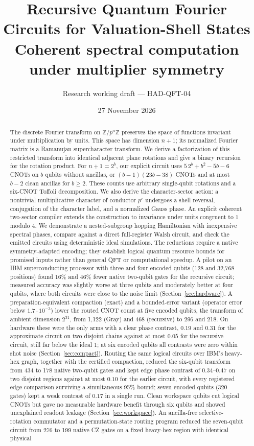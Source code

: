 \documentclass[11pt]{article}
\title{Recursive Quantum Fourier Circuits for Valuation-Shell States\\[3pt]\large Coherent spectral computation under multiplier symmetry}
\author{Research working draft --- HAD-QFT-04}
\date{27 November 2026}
\newcommand{\Z}{\mathbb Z}
\begin{document}
\maketitle
\begin{abstract}
The discrete Fourier transform on $\Z/p^n\Z$ preserves the space of functions invariant under multiplication by units. This space has dimension $n+1$; its normalized Fourier matrix is a Ramanujan supercharacter transform. We derive a factorization of this restricted transform into identical adjacent plane rotations and give a binary recursion for the rotation product. For $n+1=2^b$, our explicit circuit uses $5\,2^b+b^2-5b-6$ CNOTs on $b$ qubits without ancillas, or $(b-1)(23b-38)$ CNOTs and at most $b-2$ clean ancillas for $b\ge2$. These counts use arbitrary single-qubit rotations and a six-CNOT Toffoli decomposition. We also derive the character-sector action: a nontrivial multiplicative character of conductor $p^c$ undergoes a shell reversal, conjugation of the character label, and a normalized Gauss phase. An explicit coherent two-sector compiler extends the construction to invariance under units congruent to $1$ modulo $4$. We demonstrate a nested-subgroup hopping Hamiltonian with inexpensive spectral phases, compare against a direct full-register Walsh circuit, and check the emitted circuits using deterministic ideal simulations. The reductions require a native symmetry-adapted encoding; they establish logical quantum resource bounds for promised inputs rather than general QFT or computational speedup. A pilot on an IBM superconducting processor with three and four encoded qubits (128 and 32,768 positions) found $16\%$ and $46\%$ fewer native two-qubit gates for the recursive circuit; measured accuracy was slightly worse at three qubits and moderately better at four qubits, where both circuits were close to the noise limit (Section~\ref{sec:hardware}). A preparation-equivalent compaction (exact) and a bounded-error variant (operator error below $1.7\cdot10^{-3}$) lower the routed CNOT count at five encoded qubits, the transform of ambient dimension $2^{31}$, from 1,122 (Gray) and 468 (recursive) to 296 and 218. On hardware these were the only arms with a clear phase contrast, $0.19$ and $0.31$ for the approximate circuit on two disjoint chains against at most $0.05$ for the recursive circuit, still far below the ideal $1$; at six encoded qubits all contrasts were zero within shot noise (Section~\ref{sec:compact}). Routing the same logical circuits over IBM's heavy-hex graph, together with the certified compaction, reduced the six-qubit transform from 434 to 178 native two-qubit gates and kept edge phase contrast of $0.34$--$0.47$ on two disjoint regions against at most $0.10$ for the earlier circuit, with every registered edge comparison surviving a simultaneous 95\% bound; seven encoded qubits (320 gates) kept a weak contrast of $0.17$ in a single run. Clean workspace qubits cut logical CNOTs but gave no measurable hardware benefit through six qubits and showed unexplained readout leakage (Section~\ref{sec:workspace}). An ancilla-free selective-rotation commutator and a permutation-state routing program reduced the seven-qubit circuit from 276 to 199 native CZ gates on a fixed heavy-hex region with identical physical 
\end{abstract}
\end{document}
